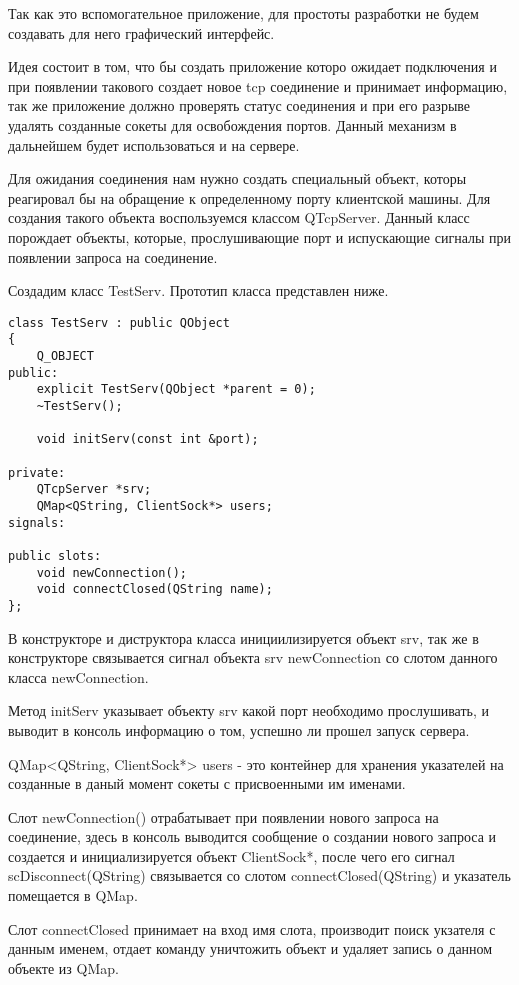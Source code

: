 Так как это вспомогательное приложение, для простоты разработки не будем создавать для него графический интерфейс. 

Идея состоит в том, что бы создать приложение которо ожидает подключения и при появлении такового создает новое tcp соединение и принимает информацию, так же приложение должно проверять статус соединения и при его разрыве удалять созданные сокеты для освобождения портов. Данный механизм в дальнейшем будет использоваться и на сервере.

Для ожидания соединения нам нужно создать специальный объект, которы реагировал бы на обращение к определенному порту клиентской машины. Для создания такого объекта воспользуемся классом QTcpServer. Данный класс порождает объекты, которые, прослушивающие порт и испускающие сигналы при появлении запроса на соединение.

Создадим класс TestServ. Прототип класса представлен ниже.

\begin{lstlisting}
class TestServ : public QObject
{
    Q_OBJECT
public:
    explicit TestServ(QObject *parent = 0);
    ~TestServ();

    void initServ(const int &port);

private:
    QTcpServer *srv;
    QMap<QString, ClientSock*> users;
signals:

public slots:
    void newConnection();
    void connectClosed(QString name);
};
\end{lstlisting}

В конструкторе и диструктора класса инициилизируется объект srv, так же в конструкторе связывается сигнал объекта srv newConnection со слотом данного класса newConnection.

Метод initServ указывает объекту srv какой порт необходимо прослушивать, и выводит в консоль информацию о том, успешно ли прошел запуск сервера.

QMap<QString, ClientSock*> users - это контейнер для хранения указателей на созданные в даный момент сокеты с присвоенными им именами.

Слот newConnection() отрабатывает при появлении нового запроса на соединение, здесь в консоль выводится сообщение о создании нового запроса и создается и инициализируется объект ClientSock*, после чего его сигнал scDisconnect(QString) связывается со слотом connectClosed(QString) и указатель помещается в QMap.

Слот connectClosed принимает на вход имя слота, производит поиск укзателя с данным именем, отдает команду уничтожить объект и удаляет запись о данном объекте из QMap.

